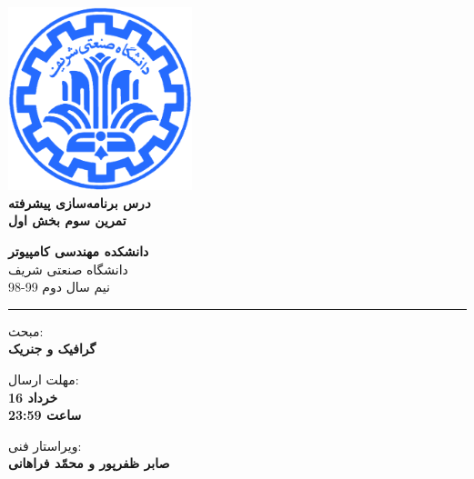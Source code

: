 \documentclass[]{article}
\begin{document}
\begin{titlepage}
\begin{center}
        
\vspace*{0.7cm}

\includegraphics[width=0.4\textwidth]{sharif1.png}\\
\vspace{0.5cm}
\textbf{ \Huge{\emph درس برنامه‌سازی پیشرفته} }\\
\vspace{0.5cm}
\textbf{ \Large{ تمرین سوم بخش اول} }
\vspace{0.2cm}
       
 
      \large \textbf{دانشکده مهندسی کامپیوتر}\\\vspace{0.2cm}
    \large   دانشگاه صنعتی شریف\\\vspace{0.2cm}
       \large   ﻧﯿﻢ سال دوم 99-98 \\\vspace{0.2cm}
      \noindent\rule[1ex]{\linewidth}{1pt}
    مبحث:\\
    \textbf{{گرافیک و جنریک}}

    \vspace{0.20cm}

   مهلت ارسال:\\
    \textbf{{16 خرداد}}\\
    \textbf{{ساعت 23:59}}

    \vspace{0.15cm}
ویراستار فنی:\\
    \textbf{{صابر ظفر‌پور و محمّد فراهانی}}
\end{center}
\end{titlepage}


\newpage
\pagestyle{fancy}
\fancyhf{}
\fancyfoot{}
\cfoot{\thepage}
\end{document}
